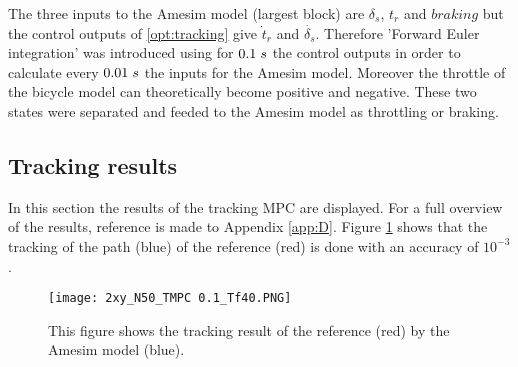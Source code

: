 The three inputs to the Amesim model (largest block) are $\delta_s$, $t_r$ and $braking$ but the control outputs of \ref{opt:tracking} give $\dot{t}_r$ and $\dot{\delta_s}$. Therefore 'Forward Euler integration' was introduced using for $0.1\hspace{1mm}s$ the control outputs in order to calculate every $0.01\hspace{1mm}s$ the inputs for the Amesim model. Moreover the throttle of the bicycle model can theoretically become positive and negative. These two states were separated and feeded to the Amesim model as throttling or braking. 


\subsection{Tracking results} 
\label{s:tracking_results}

In this section the results of the tracking MPC are displayed. For a full overview of the results, reference is made to Appendix \ref{app:D}. Figure \ref{fig:xy_mpc} shows that the tracking of the path (blue) of the reference (red) is done with an accuracy of $10^{-3}$. 

\begin{figure}[h!]
	\centering
	\texttt{[image: 2xy\_N50\_TMPC 0.1\_Tf40.PNG]}
	\caption{This figure shows the tracking result of the reference (red) by the Amesim model (blue).}	
	\label{fig:xy_mpc}
\end{figure}

